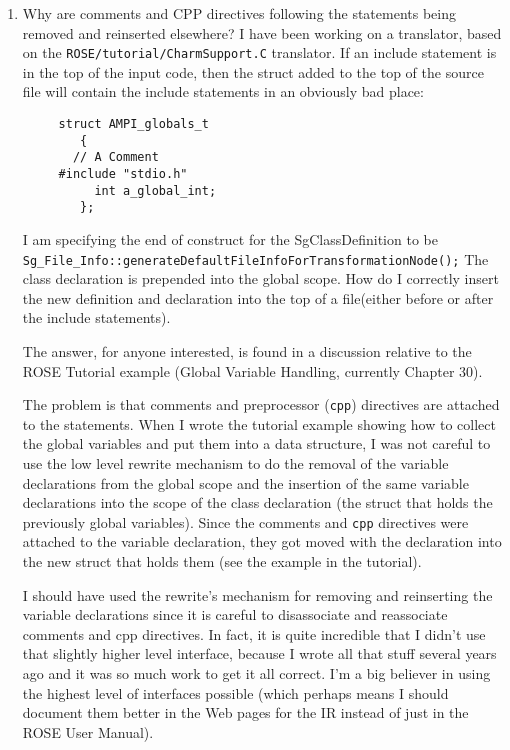 \begin{enumerate}
\item Why are comments and CPP directives following the statements being 
      removed and reinserted elsewhere?
      I have been working on a translator, based on the 
      {\tt ROSE/tutorial/CharmSupport.C} translator. If an include statement is in the 
      top of the input code, then the struct added to the top of the source 
      file will contain the include statements in an obviously bad place:
{\indent
{\mySmallFontSize
\begin{verbatim}
     struct AMPI_globals_t
        {
       // A Comment
     #include "stdio.h"
          int a_global_int;
        };
\end{verbatim}
}}
   I am specifying the end of construct for the SgClassDefinition to be 
{\tt Sg\_File\_Info::generateDefaultFileInfoForTransformationNode();} The class 
declaration is prepended into the global scope. How do I correctly 
insert the new definition and declaration into the top of a file(either 
before or after the include statements).


The answer, for anyone interested, is found in a discussion relative to the ROSE Tutorial
example (Global Variable Handling, currently Chapter 30).  

The problem is that comments and preprocessor ({\tt cpp}) directives
are attached to the statements. When I wrote the tutorial example
showing how to collect the global variables and put them into a 
data structure, I was not careful to use the low level rewrite mechanism
to do the removal of the variable declarations from the global scope
and the insertion of the same variable declarations into the scope of
the class declaration (the struct that holds the previously global 
variables).  Since the comments and {\tt cpp} directives were attached to
the variable declaration, they got moved with the declaration into the 
new struct that holds them (see the example in the tutorial).

   I should have used the rewrite's mechanism for removing and
reinserting the variable declarations since it is careful to 
disassociate and reassociate comments and cpp directives.
In fact, it is quite incredible that I didn't use that 
slightly higher level interface, because I wrote all that stuff
several years ago and it was so much work to get it all correct.
I'm a big believer in using the highest level of interfaces
possible (which perhaps means I should document them better 
in the Web pages for the IR instead of just in the ROSE User Manual).


\end{enumerate}
